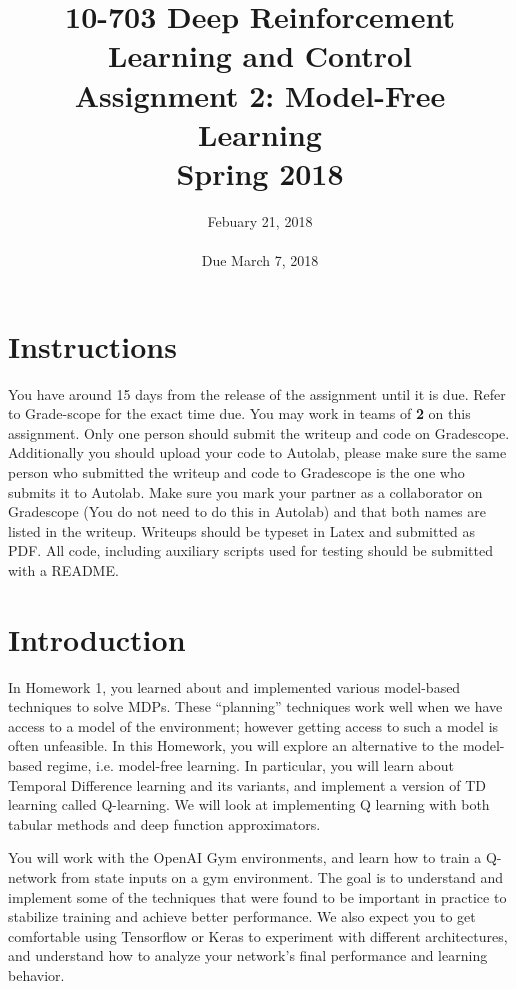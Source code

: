 \documentclass[12pt]{article}
\title{10-703 Deep Reinforcement Learning and Control\\
  Assignment 2: Model-Free Learning\\
  Spring 2018\\
}
\date{Febuary 21, 2018\\
  \hspace{1cm}\\
Due March 7, 2018}
\begin{document}
\maketitle

\section*{Instructions}

You have around 15 days from the release of the assignment until it is due. Refer to Grade-scope for the exact time due.  You may work in teams of \textbf{2} on this assignment. Only one person should submit the writeup and code on Gradescope. Additionally you should upload your code to Autolab, please make sure the same person who submitted the writeup and code to Gradescope is the one who submits it to Autolab.  Make sure you mark your partner as a collaborator on Gradescope (You do not need to do this in Autolab) and that both names are listed in the writeup.  Writeups should be typeset in Latex and submitted as PDF. All code, including auxiliary scripts used for testing should be
submitted with a README.

\section*{Introduction}

In Homework 1, you learned about and implemented various model-based techniques to solve MDPs. These ``planning'' techniques work well when we have access to a model of the environment; however getting access to such a model is often unfeasible. In this Homework, you will explore an alternative to the model-based regime, i.e. model-free learning. 
In particular, you will learn about Temporal Difference learning and its variants, and implement a version of TD learning called Q-learning. We will look at implementing Q learning with both tabular methods and deep function approximators. 

You will work with the OpenAI Gym environments, and learn how to train a Q-network from state inputs on a gym environment. The goal is to understand and implement some of the techniques that were found to be important in practice to stabilize training and achieve better performance. We also expect you to get comfortable using Tensorflow or Keras to experiment with different architectures, and understand how to analyze your network's final performance and learning behavior. 
\end{document}
